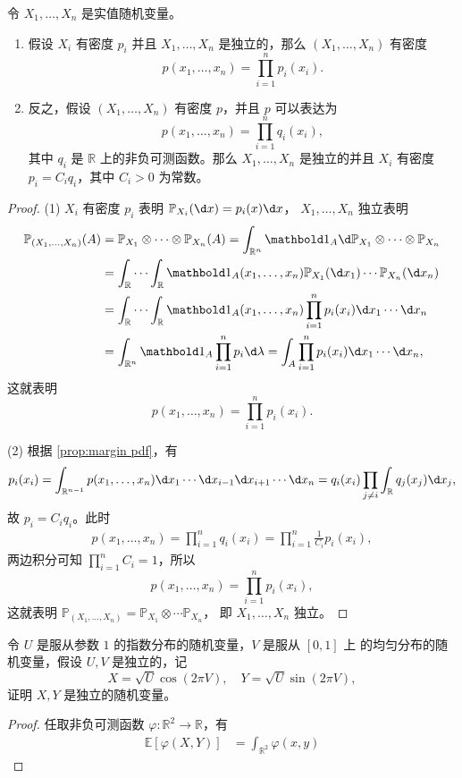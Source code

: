 \documentclass[fontset=none]{Notes}
\newcommand{\indicator}[1]{\mathbold 1_{#1}}
\begin{document}
\begin{corollary}
  令 $X_1,\dots,X_n$ 是实值随机变量。
  \begin{enumerate}
    \item 假设 $X_i$ 有密度 $p_i$ 并且 $X_1,\dots,X_n$ 是独立的，那么
    $(X_1,\dots,X_n)$ 有密度
    \[
      p(x_1,\dots,x_n)=\prod_{i=1}^n p_i(x_i).  
    \]
    \item 反之，假设 $(X_1,\dots,X_n)$ 有密度 $p$，并且
    $p$ 可以表达为
    \[
    p(x_1,\dots,x_n)=\prod_{i=1}^n q_i(x_i),  
    \]
    其中 $q_i$ 是 $\mathbb{R}$ 上的非负可测函数。那么 $X_1,\dots,X_n$
    是独立的并且 $X_i$ 有密度 $p_i=C_iq_i$，其中 $C_i>0$ 为常数。
  \end{enumerate}
\end{corollary}
\begin{proof}
  (1) $X_i$ 有密度 $p_i$ 表明 $\mathbb{P}_{X_i}(\d x)=p_i(x)\d x$，
  $X_1,\dots,X_n$ 独立表明
  \begin{align*}
    \mathbb{P}_{(X_1,\dots,X_n)}(A)&=
    \mathbb{P}_{X_1}\otimes\cdots\otimes \mathbb{P}_{X_n}(A)
    =\int_{\mathbb{R}^n} \indicator{A} \d \mathbb{P}_{X_1}\otimes\cdots\otimes \mathbb{P}_{X_n}
    \\
    &=\int_{\mathbb{R}}\cdots \int_{\mathbb{R}}\indicator{A}(x_1,\dots,x_n)
    \mathbb{P}_{X_1}(\d x_1)\cdots \mathbb{P}_{X_n}(\d x_n) \\
    &=\int_{\mathbb{R}}\cdots \int_{\mathbb{R}}\indicator{A}(x_1,\dots,x_n)
    \prod_{i=1}^n p_i(x_i)
    \d x_1\cdots \d x_n\\
    &=\int_{\mathbb{R}^n} \indicator{A}\prod_{i=1}^n p_i \d \lambda
    =\int_A \prod_{i=1}^np_i(x_i) \d x_1\cdots\d x_n,
  \end{align*}
  这就表明 
  \[
    p(x_1,\dots,x_n)=\prod_{i=1}^n p_i(x_i).  
  \]

  (2) 根据 \autoref{prop:margin pdf}，有
  \[
    p_i(x_i)=\int_{\mathbb{R}^{n-1}}p(x_1,\dots,x_n)\d x_1\cdots \d x_{i-1}
    \d x_{i+1}\cdots\d x_n
    =q_i(x_i)\prod_{j\neq i}\int_{\mathbb{R}}q_j(x_j)\d x_j,
  \]
  故 $p_i=C_iq_i$。此时
  \begin{align*}
    p(x_1,\dots,x_n)=\prod_{i=1}^n q_i(x_i)
    =\prod_{i=1}^n \frac{1}{C_i}p_i(x_i),
  \end{align*}
  两边积分可知 $\prod_{i=1}^n C_i=1$，所以
  \[
    p(x_1,\dots,x_n)=\prod_{i=1}^n p_i(x_i),  
  \]
  这就表明 $\mathbb{P}_{(X_1,\dots,X_n)}=\mathbb{P}_{X_1}\otimes\cdots \mathbb{P}_{X_n}$，
  即 $X_1,\dots,X_n$ 独立。
\end{proof} 

\begin{example}
  令 $U$ 是服从参数 $1$ 的指数分布的随机变量，$V$ 是服从 $[0,1]$ 上
  的均匀分布的随机变量，假设 $U,V$ 是独立的，记
  \[
    X=\sqrt{U}\cos(2\pi V),\quad Y=\sqrt{U}\sin(2\pi V),  
  \]
  证明 $X,Y$ 是独立的随机变量。
\end{example}
\begin{proof}
  任取非负可测函数 $\varphi:\mathbb{R}^2\to \mathbb{R}$，有
  \begin{align*}
    \mathbb{E}[\varphi(X,Y)]&=\int_{\mathbb{R}^2}\varphi(x,y)
  \end{align*}
\end{proof}
\end{document}
